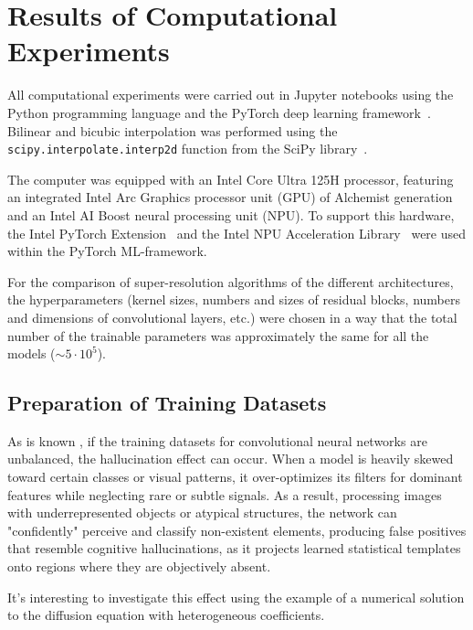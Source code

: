 \documentclass{ieeeaccess}
\begin{document}
\section{Results of Computational Experiments}

All computational experiments were carried out in Jupyter notebooks using the Python programming language and the PyTorch deep learning framework~\cite{Paszke}. Bilinear and bicubic interpolation was performed using the \texttt{scipy.interpolate.interp2d} function from the SciPy library~\cite{Johansson}.

The computer was equipped with an Intel Core Ultra 125H processor, featuring an integrated Intel Arc Graphics processor unit  (GPU) of Alchemist generation  and an Intel AI Boost neural processing unit (NPU). To support this hardware, the Intel PyTorch Extension~\cite{Intel1} and the Intel NPU Acceleration Library~\cite{Intel2} were used within the PyTorch ML-framework.

For the comparison of super-resolution algorithms of the different architectures, the hyperparameters  (kernel sizes, numbers and sizes of residual blocks, numbers and dimensions of convolutional layers, etc.) were chosen in a way that the total number of the trainable parameters was approximately the same for all the models ($\sim 5 \cdot 10^5$).

\subsection{Preparation of Training Datasets}

As is known \cite{Buda}, if the training datasets for convolutional neural networks are unbalanced, the hallucination effect can occur. When a model is heavily skewed toward certain classes or visual patterns, it over-optimizes its filters for dominant features while neglecting rare or subtle signals. As a result, processing images with underrepresented objects or atypical structures, the network can "confidently" perceive and classify non-existent elements, producing false positives that resemble cognitive hallucinations, as it projects learned statistical templates onto regions where they are objectively absent.

It's interesting to investigate this effect using the example of a numerical solution to the diffusion equation with heterogeneous coefficients.
\end{document}
